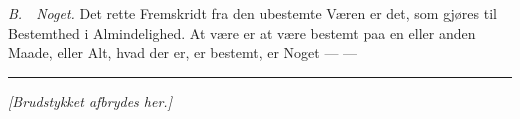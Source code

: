 \documentclass[12pt]{article}
\begin{document}
\emph{B.}~~\emph{Noget.} Det rette Fremskridt fra den ubestemte Væren er det, som
gjøres til Bestemthed i Almindelighed. At være er at være bestemt paa en eller
anden Maade, eller Alt, hvad der er, er bestemt, er Noget --- ---

\begin{center}\rule{0.32\textwidth}{0.4pt}\end{center}

\medskip
\begin{center}\footnotesize\textit{[Brudstykket afbrydes her.]}\end{center}
\end{document}
